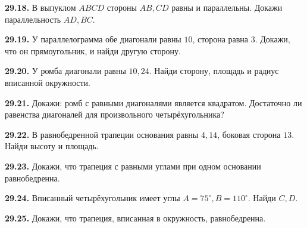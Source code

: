\noindent\begin{minipage}[t]{\linewidth}\textbf{29.18.}\starmark{} В выпуклом \(ABCD\) стороны \(AB,CD\) равны и параллельны. Докажи параллельность \(AD,BC\).\par\end{minipage}\par
\noindent\begin{minipage}[t]{\linewidth}\textbf{29.19.} У параллелограмма обе диагонали равны \(10\), сторона равна \(3\). Докажи, что он прямоугольник, и найди другую сторону.\par\end{minipage}\par
\noindent\begin{minipage}[t]{\linewidth}\textbf{29.20.} У ромба диагонали равны \(10,24\). Найди сторону, площадь и радиус вписанной окружности.\par\end{minipage}\par
\noindent\begin{minipage}[t]{\linewidth}\textbf{29.21.}\starmark{} Докажи: ромб с равными диагоналями является квадратом. Достаточно ли равенства диагоналей для произвольного четырёхугольника?\par\end{minipage}\par
\noindent\begin{minipage}[t]{\linewidth}\textbf{29.22.} В равнобедренной трапеции основания равны \(4,14\), боковая сторона \(13\). Найди высоту и площадь.\par\end{minipage}\par
\noindent\begin{minipage}[t]{\linewidth}\textbf{29.23.}\starmark{} Докажи, что трапеция с равными углами при одном основании равнобедренна.\par\end{minipage}\par
\noindent\begin{minipage}[t]{\linewidth}\textbf{29.24.} Вписанный четырёхугольник имеет углы \(A=75^\circ,B=110^\circ\). Найди \(C,D\).\par\end{minipage}\par
\noindent\begin{minipage}[t]{\linewidth}\textbf{29.25.}\starmark{} Докажи, что трапеция, вписанная в окружность, равнобедренна.\par\end{minipage}\par

